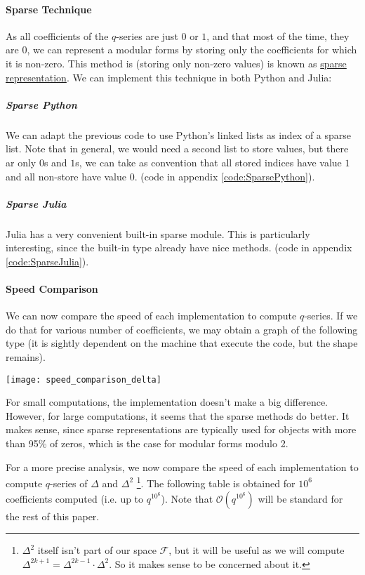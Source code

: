 \paragraph{Sparse Technique}
As all coefficients of the $q$-series are just $0$ or $1$, and that most of the time, they are $0$, we can represent a modular forms by storing only the coefficients for which it is non-zero.
This method is (storing only non-zero values) is known as \href{https://en.wikipedia.org/wiki/Sparse_matrix}{sparse representation}.
We can implement this technique in both Python and Julia:
\subparagraph{Sparse Python}
We can adapt the previous code to use Python's linked lists as index of a sparse list.
Note that in general, we would need a second list to store values, but there ar only $0$s and $1$s, we can take as convention that all stored indices have value $1$ and all non-store have value $0$.
(code in appendix \ref{code:SparsePython}). 
\subparagraph{Sparse Julia}
Julia has a very convenient built-in sparse module.
This is particularly interesting, since the built-in type already have nice methods.
(code in appendix \ref{code:SparseJulia}).

\paragraph{Speed Comparison}
We can now compare the speed of each implementation to compute $q$-series.
If we do that for various number of coefficients, we may obtain a graph of the following type (it is sightly dependent on the machine that execute the code, but the shape remains).

\texttt{[image: speed\_comparison\_delta]}

For small computations, the implementation doesn't make a big difference.
However, for large computations, it seems that the sparse methods do better.
It makes sense, since sparse representations are typically used for objects with more than 95\% of zeros, which is the case for modular forms modulo 2.

For a more precise analysis, we now compare the speed of each implementation to compute $q$-series of $\Delta$ and $\Delta^2$
\footnote{$\Delta^2$ itself isn't part of our space $\mathcal{F}$, but it will be useful as we will compute $\Delta^{2k+1} = \Delta^{2k-1}\cdot \Delta^2$. So it makes sense to be concerned about it.}.
The following table is obtained for $10^6$ coefficients computed (i.e. up to $q^{10^6}$).
Note that $\mathcal{O}(q^{10^6})$ will be standard for the rest of this paper.

